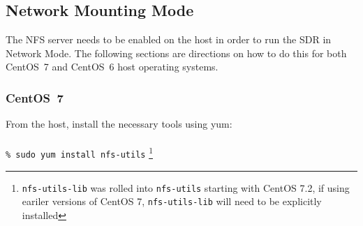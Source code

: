 \iffalse
This file is protected by Copyright. Please refer to the COPYRIGHT file
distributed with this source distribution.

This file is part of OpenCPI <http://www.opencpi.org>

OpenCPI is free software: you can redistribute it and/or modify it under the
terms of the GNU Lesser General Public License as published by the Free Software
Foundation, either version 3 of the License, or (at your option) any later
version.

OpenCPI is distributed in the hope that it will be useful, but WITHOUT ANY
WARRANTY; without even the implied warranty of MERCHANTABILITY or FITNESS FOR A
PARTICULAR PURPOSE. See the GNU Lesser General Public License for more details.

You should have received a copy of the GNU Lesser General Public License along
with this program. If not, see <http://www.gnu.org/licenses/>.
\fi

\newlength{\savedparindentnfs}%
\setlength{\savedparindentnfs}{\parindent}%
\setlength{\parindent}{0pt} %
\providecommand{\forceindent}{\leavevmode{\parindent=1em\indent}}%

\subsection{Network Mounting Mode}
\label{sec:network_mode}
The NFS server needs to be enabled on the host in order to run the SDR in Network Mode. The following sections are directions on how to do this for both CentOS~7 and CentOS~6 host operating systems.
\subsubsection{CentOS~7}
From the host, install the necessary tools using yum:\\
~\\
\verb+% sudo yum install nfs-utils+ \footnote{\texttt{nfs-utils-lib} was rolled into \texttt{nfs-utils} starting with CentOS 7.2, if using eariler versions of CentOS 7, \texttt{nfs-utils-lib} will need to be explicitly installed}
~\\

